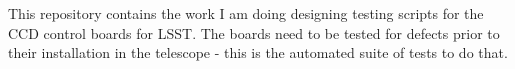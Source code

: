This repository contains the work I am doing designing testing scripts for the C\+CD control boards for L\+S\+ST. The boards need to be tested for defects prior to their installation in the telescope -\/ this is the automated suite of tests to do that. 